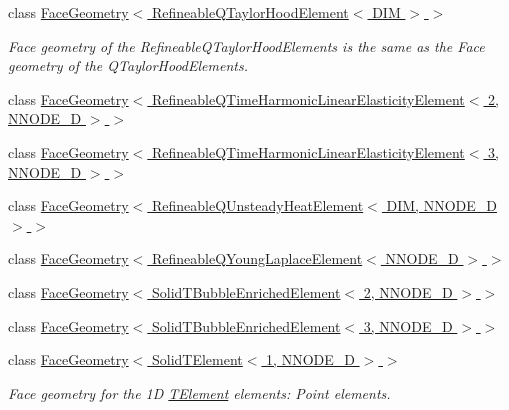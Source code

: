 \begin{DoxyCompactItemize}
class \hyperlink{classoomph_1_1FaceGeometry_3_01RefineableQTaylorHoodElement_3_01DIM_01_4_01_4}{Face\+Geometry$<$ Refineable\+Q\+Taylor\+Hood\+Element$<$ D\+I\+M $>$ $>$}
\begin{DoxyCompactList}\small\item\em Face geometry of the Refineable\+Q\+Taylor\+Hood\+Elements is the same as the Face geometry of the Q\+Taylor\+Hood\+Elements. \end{DoxyCompactList}\item 
class \hyperlink{classoomph_1_1FaceGeometry_3_01RefineableQTimeHarmonicLinearElasticityElement_3_012_00_01NNODE__1D_01_4_01_4}{Face\+Geometry$<$ Refineable\+Q\+Time\+Harmonic\+Linear\+Elasticity\+Element$<$ 2, N\+N\+O\+D\+E\+\_\+D $>$ $>$}
\item 
class \hyperlink{classoomph_1_1FaceGeometry_3_01RefineableQTimeHarmonicLinearElasticityElement_3_013_00_01NNODE__1D_01_4_01_4}{Face\+Geometry$<$ Refineable\+Q\+Time\+Harmonic\+Linear\+Elasticity\+Element$<$ 3, N\+N\+O\+D\+E\+\_\+D $>$ $>$}
\item 
class \hyperlink{classoomph_1_1FaceGeometry_3_01RefineableQUnsteadyHeatElement_3_01DIM_00_01NNODE__1D_01_4_01_4}{Face\+Geometry$<$ Refineable\+Q\+Unsteady\+Heat\+Element$<$ D\+I\+M, N\+N\+O\+D\+E\+\_\+D $>$ $>$}
\item 
class \hyperlink{classoomph_1_1FaceGeometry_3_01RefineableQYoungLaplaceElement_3_01NNODE__1D_01_4_01_4}{Face\+Geometry$<$ Refineable\+Q\+Young\+Laplace\+Element$<$ N\+N\+O\+D\+E\+\_\+D $>$ $>$}
\item 
class \hyperlink{classoomph_1_1FaceGeometry_3_01SolidTBubbleEnrichedElement_3_012_00_01NNODE__1D_01_4_01_4}{Face\+Geometry$<$ Solid\+T\+Bubble\+Enriched\+Element$<$ 2, N\+N\+O\+D\+E\+\_\+D $>$ $>$}
\item 
class \hyperlink{classoomph_1_1FaceGeometry_3_01SolidTBubbleEnrichedElement_3_013_00_01NNODE__1D_01_4_01_4}{Face\+Geometry$<$ Solid\+T\+Bubble\+Enriched\+Element$<$ 3, N\+N\+O\+D\+E\+\_\+D $>$ $>$}
\item 
class \hyperlink{classoomph_1_1FaceGeometry_3_01SolidTElement_3_011_00_01NNODE__1D_01_4_01_4}{Face\+Geometry$<$ Solid\+T\+Element$<$ 1, N\+N\+O\+D\+E\+\_\+D $>$ $>$}
\begin{DoxyCompactList}\small\item\em Face geometry for the 1D \hyperlink{classoomph_1_1TElement}{T\+Element} elements\+: Point elements. \end{DoxyCompactList}\item 

\end{DoxyCompactItemize}
